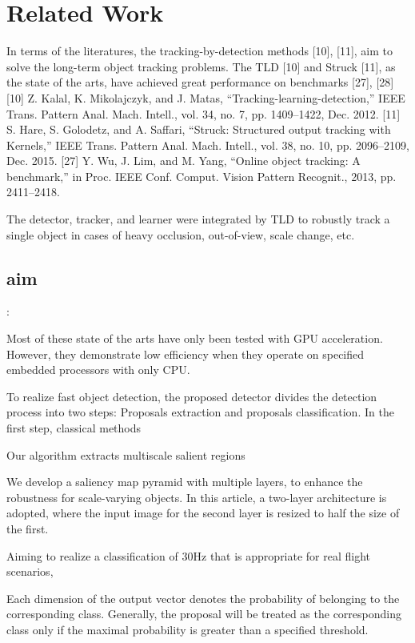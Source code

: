 \documentclass[a4paper]{report}
\begin{document}
\section{Related Work}
In terms of the literatures, the tracking-by-detection methods [10], [11], aim to solve the long-term object tracking problems. The TLD [10] and Struck [11], as the state of the arts, have achieved great performance on benchmarks [27], [28]
[10] Z. Kalal, K. Mikolajczyk, and J. Matas, “Tracking-learning-detection,”
IEEE Trans. Pattern Anal. Mach. Intell., vol. 34, no. 7, pp. 1409–1422,
Dec. 2012.
[11] S. Hare, S. Golodetz, and A. Saffari, “Struck: Structured output tracking
with Kernels,” IEEE Trans. Pattern Anal. Mach. Intell., vol. 38, no. 10,
pp. 2096–2109, Dec. 2015.
[27] Y. Wu, J. Lim, and M. Yang, “Online object tracking: A benchmark,” in
Proc. IEEE Conf. Comput. Vision Pattern Recognit., 2013, pp. 2411–2418.

The detector, tracker, and learner were integrated by TLD to robustly track a single object in cases of heavy occlusion, out-of-view, scale change, etc. 


\subsection{aim}:

Most of these state of the arts have only been tested with GPU acceleration. However,
they demonstrate low efficiency when they operate on specified embedded processors with only CPU.

To realize fast object detection, the proposed detector divides the detection process into two steps: Proposals extraction and proposals classification. In the first step, classical methods

Our algorithm extracts multiscale salient regions

We develop a saliency map pyramid with multiple layers, to enhance the robustness for
scale-varying objects. In this article, a two-layer architecture is adopted, where the input image for the second layer is resized to half the size of the first.

Aiming to realize a classification of 30Hz that is appropriate for real flight scenarios,

Each dimension of the output vector denotes the probability of
belonging to the corresponding class. Generally, the proposal
will be treated as the corresponding class only if the maximal
probability is greater than a specified threshold.
\end{document}
